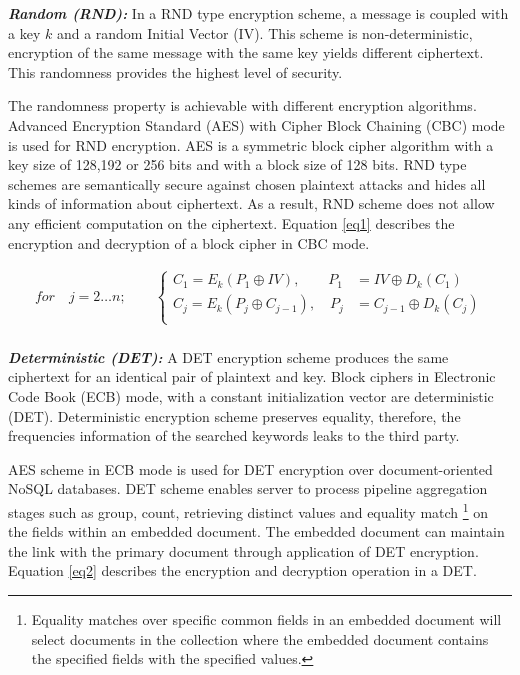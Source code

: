 \smallskip


\noindent \textbf{\textit{Random (RND):}} In a RND type encryption scheme, a message is coupled with a key $k$ and a random Initial Vector (IV). This scheme is non-deterministic, encryption of the same message with the same key yields different ciphertext. This randomness provides the highest level of security. 

The randomness property is achievable with different encryption algorithms. Advanced Encryption Standard (AES) with Cipher Block Chaining (CBC) mode is used for RND encryption. AES is a symmetric block cipher algorithm with a key size of 128,192 or 256 bits and with a block size of 128 bits. RND type schemes are semantically secure against chosen plaintext attacks and hides all kinds of information about ciphertext. As a result, RND scheme does not allow any efficient computation on the ciphertext. Equation \ref{eq1} describes the encryption and decryption of a block cipher in CBC mode.

\begin{equation} 
\label{eq1}
\begin{aligned}
for \quad j=2 \ldots n ;\qquad \begin{cases}
C_1 = E_k(P_1 \oplus IV), \qquad P_1 &= IV \oplus D_k(C_1) \\
C_j = E_k(P_j \oplus C_{j-1}), \quad 
P_j &= C_{j-1} \oplus 
D_k(C_j)\\ 
\end{cases}\\
\end{aligned}
\end{equation}

\medskip

\noindent \textbf{\textit{Deterministic (DET):}} A DET encryption scheme produces the same ciphertext for an identical pair of plaintext and key. Block ciphers in Electronic Code Book (ECB) mode, with a constant initialization vector are deterministic (DET). Deterministic encryption scheme preserves equality, therefore, the frequencies information of the searched keywords leaks to the third party. 

AES scheme in ECB mode is used for DET encryption over document-oriented NoSQL databases. DET scheme enables server to process pipeline aggregation stages such as group, count, retrieving distinct values and equality match \footnote{Equality matches over specific common fields in an embedded document will select documents in the collection where the embedded document contains the specified fields with the specified values.} on the fields within an embedded document. The embedded document can maintain the link with the primary document through application of DET encryption. Equation \ref{eq2} describes the encryption and decryption operation in a DET.

